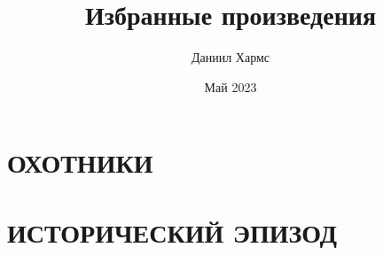 \documentclass{book}
\title{Избранные произведения}
\author{Даниил Хармс}
\date{Май 2023}
\begin{document}
\maketitle
\chapter{ОХОТНИКИ}

\chapter{ИСТОРИЧЕСКИЙ ЭПИЗОД}

\end{document}
